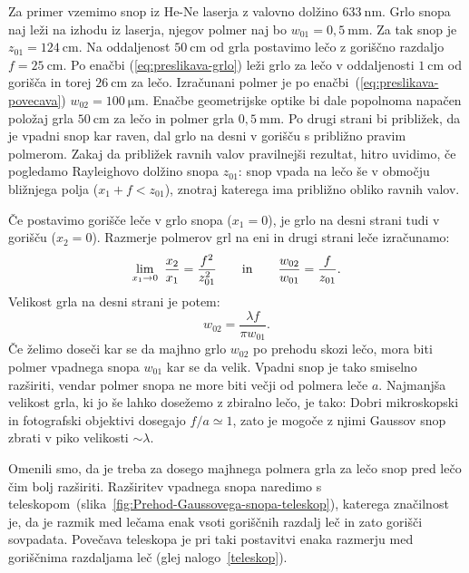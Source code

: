 Za primer vzemimo snop iz He-Ne laserja z valovno dolžino 
$633~\si{\nano\metre}$. Grlo snopa naj leži na izhodu iz laserja, njegov polmer naj bo 
$w_{01}=0,5~\si{\milli\metre}$. Za tak snop je $z_{01}=124~\si{\centi\metre}$. 
Na oddaljenost $50~\si{\centi\metre}$ od grla postavimo lečo z goriščno razdaljo 
$f=25~\si{\centi\metre}$. Po enačbi (\ref{eq:preslikava-grlo})
leži grlo za lečo v oddaljenosti $1~\si{\centi\metre}$ od gorišča in torej $26~\si{\centi\metre}$ 
za lečo. Izračunani polmer je po enačbi~(\ref{eq:preslikava-povecava})
$w_{02}=100~\si{\micro\metre}$. Enačbe geometrijske optike bi
dale popolnoma napačen položaj grla $50~\si{\centi\metre}$ za lečo in polmer grla  
$0,5~\si{\milli\metre}$. Po drugi strani bi približek, da je vpadni
snop kar raven, dal grlo na desni v gorišču s približno pravim polmerom. Zakaj da približek ravnih 
valov pravilnejši rezultat, hitro uvidimo, če pogledamo
Rayleighovo dolžino snopa $z_{01}$: 
snop vpada na lečo še v območju bližnjega polja ($x_1 + f < z_{01}$), znotraj katerega
ima približno obliko ravnih valov. 

Če postavimo gorišče leče v grlo snopa ($x_{1}=0$), je grlo na
desni strani tudi v gorišču ($x_{2}=0$). Razmerje polmerov grl
na eni in drugi strani leče izračunamo:
\begin{equation}
\lim_{x_1 \to 0}~\frac{x_{2}}{x_{1}}=\frac{f^{2}}{z_{01}^{2}} \qquad \textrm{in} \qquad
\frac{w_{02}}{w_{01}}= \frac{f}{z_{01}}.\index{Gaussov snop!grlo}
\end{equation}
Velikost grla na desni strani je potem:
\begin{equation}
w_{02}=\frac{\lambda f}{\pi w_{01}}.
\end{equation}
Če želimo doseči kar se da majhno grlo $w_{02}$ po prehodu skozi lečo, mora biti polmer
vpadnega snopa $w_{01}$  kar se da velik. Vpadni snop je tako smiselno
razširiti, vendar polmer snopa ne more biti večji od polmera leče $a$. 
Najmanjša velikost grla, ki jo še lahko dosežemo z zbiralno lečo, je tako:
Dobri mikroskopski in fotografski
objektivi dosegajo $f/a\simeq 1$, zato je mogoče z njimi Gaussov snop
zbrati v piko velikosti $\sim\lambda$. 

Omenili smo, da je treba za dosego majhnega polmera grla za lečo snop pred lečo čim bolj razširiti.
Razširitev vpadnega snopa naredimo s teleskopom~(slika~\ref{fig:Prehod-Gaussovega-snopa-teleskop}),
katerega značilnost je, da je razmik med lečama enak vsoti goriščnih razdalj leč in zato gorišči
sovpadata. Povečava teleskopa je pri taki postavitvi enaka razmerju med goriščnima razdaljama leč
(glej nalogo~\ref{teleskop}).


